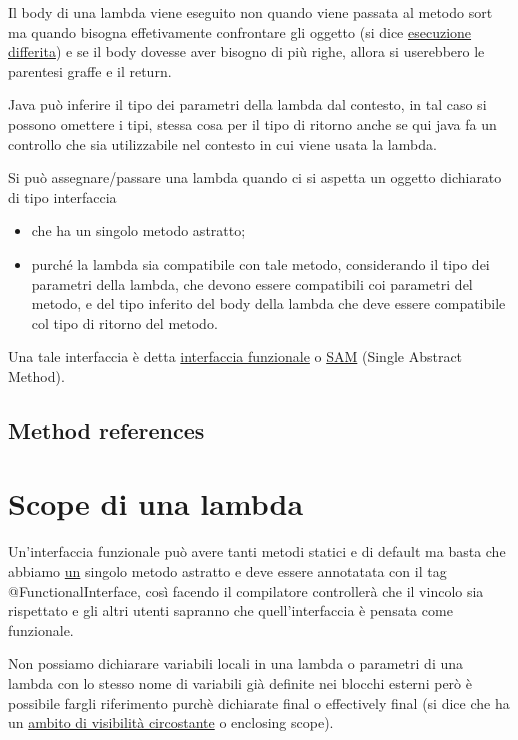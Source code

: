 Il body di una lambda viene eseguito non quando viene passata al metodo sort ma quando bisogna effetivamente confrontare gli oggetto 
(si dice \underline{esecuzione differita}) e se il body dovesse aver bisogno di più righe, allora si userebbero le parentesi graffe e il return.
\smallskip

Java può inferire il tipo dei parametri della lambda dal contesto, in tal caso si possono omettere i tipi, stessa cosa per il tipo di ritorno anche se qui java fa un 
controllo che sia utilizzabile nel contesto in cui viene usata la lambda.

Si può assegnare/passare una lambda quando ci si aspetta un oggetto dichiarato di tipo interfaccia
\begin{itemize}
    \item che ha un singolo metodo astratto;
    \item purché la lambda sia compatibile con tale metodo, considerando il tipo dei parametri della lambda, che devono essere compatibili coi parametri del metodo, 
    e del tipo inferito del body della lambda che deve essere compatibile col tipo di ritorno del metodo.
\end{itemize}

Una tale interfaccia è detta \underline{interfaccia funzionale} o \underline{SAM} (Single Abstract Method).

\subsection{Method references}


\section{Scope di una lambda}
Un'interfaccia funzionale può avere tanti metodi statici e di default ma basta che abbiamo \underline{un} singolo metodo astratto e deve essere annotatata con il tag 
@FunctionalInterface, così facendo il compilatore controllerà che il vincolo sia rispettato e gli altri utenti sapranno che quell'interfaccia è pensata come funzionale.
\smallskip

Non possiamo dichiarare variabili locali in una lambda o parametri di una lambda con lo stesso nome di variabili già definite nei blocchi esterni però è possibile
fargli riferimento purchè dichiarate final o effectively final (si dice che ha un \underline{ambito di visibilità circostante} o enclosing scope). 

